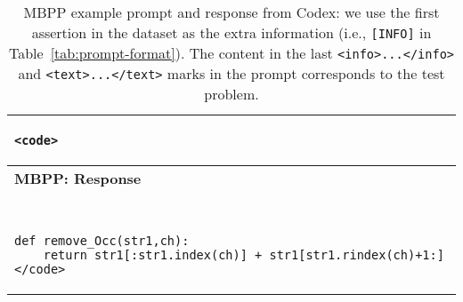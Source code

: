 \documentclass[11pt]{article}
\begin{document}
\begin{table*}[t]
\begin{tabular}{p{}}
\begin{lstlisting}
<code>
    \end{lstlisting} \\[-15pt]
    \midrule 
    \midrule
    \textbf{MBPP: Response} \\
    \midrule ~\\[-22pt]
    \begin{lstlisting}
def remove_Occ(str1,ch):
    return str1[:str1.index(ch)] + str1[str1.rindex(ch)+1:]</code>
    \end{lstlisting} \\[-15pt]
    \bottomrule
    \end{tabular}
    \caption{\label{tab:real-prompt-mbpp} MBPP example prompt and response from Codex: we use the first assertion in the dataset as the extra information (i.e., \texttt{[INFO]} in Table~\ref{tab:prompt-format}). The content in the last \texttt{<info>...</info>} and \texttt{<text>...</text>} marks in the prompt corresponds to the test problem.}
\end{table*}
\end{document}
